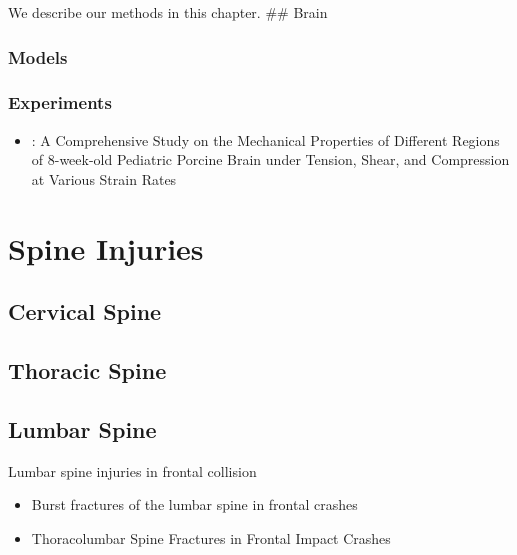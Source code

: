 \documentclass[]{book}
\providecommand{\tightlist}{%
  \setlength{\itemsep}{0pt}\setlength{\parskip}{0pt}}
\begin{document}
We describe our methods in this chapter.
\#\# Brain

\hypertarget{models}{%
\subsection{Models}\label{models}}

\hypertarget{experiments}{%
\subsection{Experiments}\label{experiments}}

\begin{itemize}
\tightlist
\item
  \citep{Li2019}: A Comprehensive Study on the Mechanical Properties of Different Regions of 8-week-old Pediatric Porcine Brain under Tension, Shear, and Compression at Various Strain Rates
\end{itemize}

\hypertarget{spine-injuries}{%
\chapter{Spine Injuries}\label{spine-injuries}}

\hypertarget{cervical-spine}{%
\section{Cervical Spine}\label{cervical-spine}}

\hypertarget{thoracic-spine}{%
\section{Thoracic Spine}\label{thoracic-spine}}

\hypertarget{lumbar-spine}{%
\section{Lumbar Spine}\label{lumbar-spine}}

Lumbar spine injuries in frontal collision

\begin{itemize}
\item
  Burst fractures of the lumbar spine in frontal crashes \citep{Kaufman_2013}
\item
  Thoracolumbar Spine Fractures in Frontal Impact Crashes \citep{Pintar2012}
\end{itemize}
\end{document}
